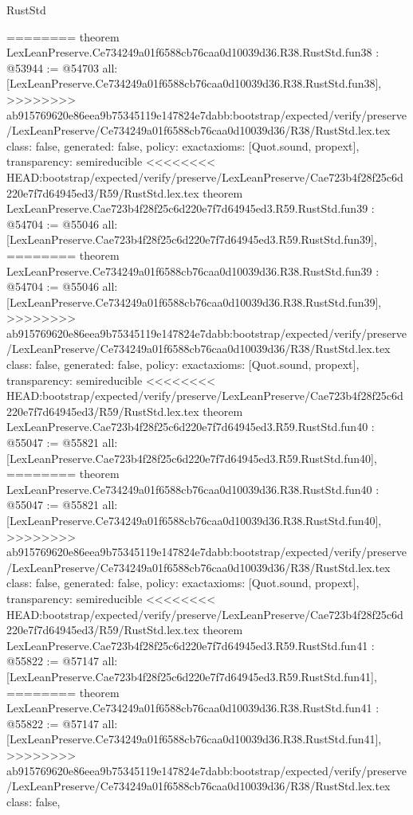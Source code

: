 \begin{lexlean}{RustStd}
\begin{coremodule}
{\begin{coremodule}
{{{{{{{{{{{{{{{{{{{{{{{{{{{{{{{{{{{{{{{{{========
theorem LexLeanPreserve.Ce734249a01f6588cb76caa0d10039d36.R38.RustStd.fun38 : @53944 := @54703 {
  all: [LexLeanPreserve.Ce734249a01f6588cb76caa0d10039d36.R38.RustStd.fun38],
>>>>>>>> ab915769620e86eea9b75345119e147824e7dabb:bootstrap/expected/verify/preserve/LexLeanPreserve/Ce734249a01f6588cb76caa0d10039d36/R38/RustStd.lex.tex
  class: false,
  generated: false,
  policy: exact{axioms: [Quot.sound, propext]},
  transparency: semireducible
}
<<<<<<<< HEAD:bootstrap/expected/verify/preserve/LexLeanPreserve/Cae723b4f28f25c6d220e7f7d64945ed3/R59/RustStd.lex.tex
theorem LexLeanPreserve.Cae723b4f28f25c6d220e7f7d64945ed3.R59.RustStd.fun39 : @54704 := @55046 {
  all: [LexLeanPreserve.Cae723b4f28f25c6d220e7f7d64945ed3.R59.RustStd.fun39],
========
theorem LexLeanPreserve.Ce734249a01f6588cb76caa0d10039d36.R38.RustStd.fun39 : @54704 := @55046 {
  all: [LexLeanPreserve.Ce734249a01f6588cb76caa0d10039d36.R38.RustStd.fun39],
>>>>>>>> ab915769620e86eea9b75345119e147824e7dabb:bootstrap/expected/verify/preserve/LexLeanPreserve/Ce734249a01f6588cb76caa0d10039d36/R38/RustStd.lex.tex
  class: false,
  generated: false,
  policy: exact{axioms: [Quot.sound, propext]},
  transparency: semireducible
}
<<<<<<<< HEAD:bootstrap/expected/verify/preserve/LexLeanPreserve/Cae723b4f28f25c6d220e7f7d64945ed3/R59/RustStd.lex.tex
theorem LexLeanPreserve.Cae723b4f28f25c6d220e7f7d64945ed3.R59.RustStd.fun40 : @55047 := @55821 {
  all: [LexLeanPreserve.Cae723b4f28f25c6d220e7f7d64945ed3.R59.RustStd.fun40],
========
theorem LexLeanPreserve.Ce734249a01f6588cb76caa0d10039d36.R38.RustStd.fun40 : @55047 := @55821 {
  all: [LexLeanPreserve.Ce734249a01f6588cb76caa0d10039d36.R38.RustStd.fun40],
>>>>>>>> ab915769620e86eea9b75345119e147824e7dabb:bootstrap/expected/verify/preserve/LexLeanPreserve/Ce734249a01f6588cb76caa0d10039d36/R38/RustStd.lex.tex
  class: false,
  generated: false,
  policy: exact{axioms: [Quot.sound, propext]},
  transparency: semireducible
}
<<<<<<<< HEAD:bootstrap/expected/verify/preserve/LexLeanPreserve/Cae723b4f28f25c6d220e7f7d64945ed3/R59/RustStd.lex.tex
theorem LexLeanPreserve.Cae723b4f28f25c6d220e7f7d64945ed3.R59.RustStd.fun41 : @55822 := @57147 {
  all: [LexLeanPreserve.Cae723b4f28f25c6d220e7f7d64945ed3.R59.RustStd.fun41],
========
theorem LexLeanPreserve.Ce734249a01f6588cb76caa0d10039d36.R38.RustStd.fun41 : @55822 := @57147 {
  all: [LexLeanPreserve.Ce734249a01f6588cb76caa0d10039d36.R38.RustStd.fun41],
>>>>>>>> ab915769620e86eea9b75345119e147824e7dabb:bootstrap/expected/verify/preserve/LexLeanPreserve/Ce734249a01f6588cb76caa0d10039d36/R38/RustStd.lex.tex
  class: false,
}}}}}}}}}}}}}}}}}}}}}}}}}}}}}}}}}}}}}}}}}}}}}
\end{coremodule}}
\end{coremodule}
\end{lexlean}
